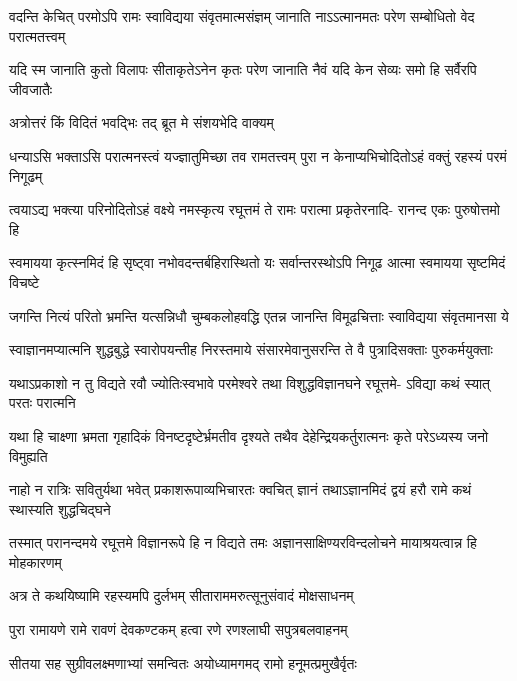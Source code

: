 \fourlineindentedshloka
{वदन्ति केचित् परमोऽपि रामः}
{स्वाविद्यया संवृतमात्मसंज्ञम्}
{जानाति नाऽऽत्मानमतः परेण}
{सम्बोधितो वेद परात्मतत्त्वम्} %

\fourlineindentedshloka
{यदि स्म जानाति कुतो विलापः}
{सीताकृतेऽनेन कृतः परेण}
{जानाति नैवं यदि केन सेव्यः}
{समो हि सर्वैरपि जीवजातैः} %

\twolineshloka
{अत्रोत्तरं किं विदितं भवद्भिः}
{तद् ब्रूत मे संशयभेदि वाक्यम्} %


\fourlineindentedshloka
{धन्याऽसि भक्ताऽसि परात्मनस्त्वं}
{यज्ज्ञातुमिच्छा तव रामतत्त्वम्}
{पुरा न केनाप्यभिचोदितोऽहं}
{वक्तुं रहस्यं परमं निगूढम्} %

\fourlineindentedshloka
{त्वयाऽद्य भक्त्या परिनोदितोऽहं}
{वक्ष्ये नमस्कृत्य रघूत्तमं ते}
{रामः परात्मा प्रकृतेरनादि-}
{रानन्द एकः पुरुषोत्तमो हि} %

\fourlineindentedshloka
{स्वमायया कृत्स्नमिदं हि सृष्ट्वा}
{नभोवदन्तर्बहिरास्थितो यः}
{सर्वान्तरस्थोऽपि निगूढ आत्मा}
{स्वमायया सृष्टमिदं विचष्टे} %

\fourlineindentedshloka
{जगन्ति नित्यं परितो भ्रमन्ति}
{यत्सन्निधौ चुम्बकलोहवद्धि}
{एतन्न जानन्ति विमूढचित्ताः}
{स्वाविद्यया संवृतमानसा ये} %

\fourlineindentedshloka
{स्वाज्ञानमप्यात्मनि शुद्धबुद्धे}
{स्वारोपयन्तीह निरस्तमाये}
{संसारमेवानुसरन्ति ते वै}
{पुत्रादिसक्ताः पुरुकर्मयुक्ताः} %

\fourlineindentedshloka
{यथाऽप्रकाशो न तु विद्यते रवौ}
{ज्योतिःस्वभावे परमेश्वरे तथा}
{विशुद्धविज्ञानघने रघूत्तमे-}
{ऽविद्या कथं स्यात् परतः परात्मनि} %

\fourlineindentedshloka
{यथा हि चाक्ष्णा भ्रमता गृहादिकं}
{विनष्टदृष्टेर्भ्रमतीव दृश्यते}
{तथैव देहेन्द्रियकर्तुरात्मनः}
{कृते परेऽध्यस्य जनो विमुह्यति} %

\fourlineindentedshloka
{नाहो न रात्रिः सवितुर्यथा भवेत्}
{प्रकाशरूपाव्यभिचारतः क्वचित्}
{ज्ञानं तथाऽज्ञानमिदं द्वयं हरौ}
{रामे कथं स्थास्यति शुद्धचिद्घने} %

\fourlineindentedshloka
{तस्मात् परानन्दमये रघूत्तमे}
{विज्ञानरूपे हि न विद्यते तमः}
{अज्ञानसाक्षिण्यरविन्दलोचने}
{मायाश्रयत्वान्न हि मोहकारणम्} %

\twolineshloka
{अत्र ते कथयिष्यामि रहस्यमपि दुर्लभम्}
{सीताराममरुत्सूनुसंवादं मोक्षसाधनम्} %

\twolineshloka
{पुरा रामायणे रामे रावणं देवकण्टकम्}
{हत्वा रणे रणश्लाघी सपुत्रबलवाहनम्} %

\twolineshloka
{सीतया सह सुग्रीवलक्ष्मणाभ्यां समन्वितः}
{अयोध्यामगमद् रामो हनूमत्प्रमुखैर्वृतः} %

